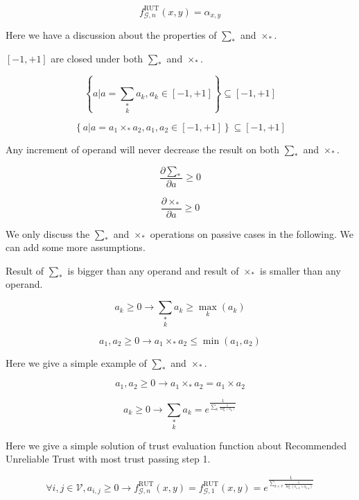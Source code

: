 \documentclass{article}
\begin{document}
\begin{equation}
f_{\mathcal{G},n}^{\text{RUT}}(x,y)=\alpha _{x,y}
\end{equation}

Here we have a discussion about the properties of \(\sum _*\) and \(\times _*\).

\([-1,+1]\) are closed under both \(\sum _*\) and \(\times _*\).

\begin{equation}
\left\{a|a=\underset{k}{\sum _*}a_k,a_k\in [-1,+1]\right\}\subseteq [-1,+1]
\end{equation}

\begin{equation}
\left\{a|a=a_1\times _*a_2,a_1,a_2\in [-1,+1]\right\}\subseteq [-1,+1]
\end{equation}

Any increment of operand will never decrease the result on both \(\sum _*\) and \(\times _*\).

\begin{equation}
\frac{\partial \sum _*}{\partial a}\geq 0
\end{equation}

\begin{equation}
\frac{\partial \times _*}{\partial a}\geq 0
\end{equation}

We only discuss the \(\sum _*\) and \(\times _*\) operations on passive cases in the following. We can add some more assumptions.

Result of \(\sum _*\) is bigger than any operand and result of \(\times _*\) is smaller than any operand.

\[a_k\geq 0\to \underset{k}{\sum _*}a_k\geq \underset{k}{\max }\left(a_k\right)\]

\[a_1,a_2\geq 0\to a_1\times _*a_2\leq \min \left(a_1,a_2\right)\]

Here we give a simple example of \(\sum _*\) and \(\times _*\).

\[a_1,a_2\geq 0\to a_1\times _*a_2=a_1\times a_2\]

\[a_k\geq 0\to \underset{k}{\sum _*}a_k=e^{\frac{1}{\sum _k \frac{1}{\log \left(a_k\right)}}}\]

Here we give a simple solution of trust evaluation function about Recommended Unreliable Trust with most trust passing step 1.

\[\forall i,j\in \mathcal{V},a_{i,j}\geq 0\to f_{\mathcal{G},n}^{\text{RUT}}(x,y)=f_{\mathcal{G},1}^{\text{RUT}}(x,y)=e^{\frac{1}{\sum _{k\in \mathcal{V}}
\frac{1}{\log \left(a_{x,k}\times a_{k,y}\right)}}}\]
\end{document}
